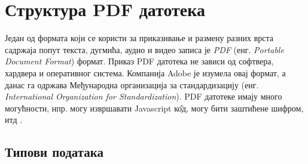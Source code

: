 \documentclass[12pt,oneside]{memoir}
\begin{document}
\chapter{Структура PDF датотека}
\label{pdfStruktura}

Један од формата који се користи за приказивање и размену разних врста садржаја попут текста, дугмића, аудио и видео записа је \textit{PDF} (енг. \textit{Portable Document Format}) формат. Приказ PDF датотека не зависи од софтвера, хардвера и оперативног система. Компанија Adobe је изумела овај формат, а данас га одржава Међународна организација за стандардизацију (енг. \textit{International Organization for Standardization}). PDF датотеке имају много могућности, нпр. могу извршавати Javascript к\^{о}д, могу бити заштићене шифром, итд \cite{adobePdf1, adobePdf2}.

\section{Типови података}
\label{sec:tipoviPodatakaPDF}
\end{document}
